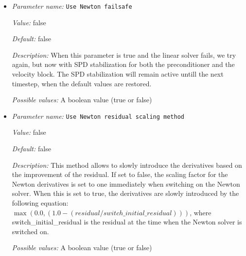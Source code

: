 \begin{itemize}
{\it Value:} false


{\it Default:} false


{\it Description:} If set to true, the Picard iteration uses the Eisenstat Walker method to determine how accurately linear systems need to be solved. The Picard iteration is used, for example, in the first few iterations of the Newton method before the matrix is built including derivatives of the model, since the Picard iteration generally converges even from points where Newton's method does not. 

Once derivatives are used in a Newton method, \aspect{} always uses the Eisenstat Walker method.


{\it Possible values:} A boolean value (true or false)
\item {\it Parameter name:} {\tt Use Newton failsafe}
\label{parameters:Solver parameters/Newton solver parameters/Use Newton failsafe}
\label{parameters:Solver_20parameters/Newton_20solver_20parameters/Use_20Newton_20failsafe}


{\it Value:} false


{\it Default:} false


{\it Description:} When this parameter is true and the linear solver fails, we try again, but now with SPD stabilization for both the preconditioner and the velocity block. The SPD stabilization will remain active untill the next timestep, when the default values are restored.


{\it Possible values:} A boolean value (true or false)
\item {\it Parameter name:} {\tt Use Newton residual scaling method}
\label{parameters:Solver parameters/Newton solver parameters/Use Newton residual scaling method}
\label{parameters:Solver_20parameters/Newton_20solver_20parameters/Use_20Newton_20residual_20scaling_20method}


{\it Value:} false


{\it Default:} false


{\it Description:} This method allows to slowly introduce the derivatives based on the improvement of the residual. If set to false, the scaling factor for the Newton derivatives is set to one immediately when switching on the Newton solver. When this is set to true, the derivatives are slowly introduced by the following equation: $\max(0.0, (1.0-(residual/switch\_initial\_residual)))$, where switch\_initial\_residual is the residual at the time when the Newton solver is switched on.


{\it Possible values:} A boolean value (true or false)
\end{itemize}

